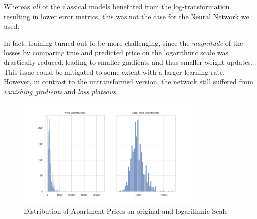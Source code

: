 \documentclass[12pt, letterpaper]{article}
\begin{document}
\begin{appendices}
    Whereas \emph{all} of the classical models benefitted from the log-transformation resulting in lower error metrics, this was not the case for the Neural Network we used.

    In fact, training turned out to be more challenging, since the \emph{magnitude} of the losses by comparing true and predicted price on the logarithmic scale was drastically reduced, leading to smaller gradients and thus smaller weight updates.
    This issue could be mitigated to some extent with a larger learning rate.
    However, in contrast to the untransformed version, the network still suffered from \emph{vanishing gradients} and \emph{loss plateaus}.

    \begin{figure}[ht]
        \centering
        \includegraphics[width=0.8\textwidth]{price_distribution.png}
        \caption{Distribution of Apartment Prices on original and logarithmic Scale}
        \label{fig:price-distribution}
    \end{figure}

\end{appendices}



\end{document}
